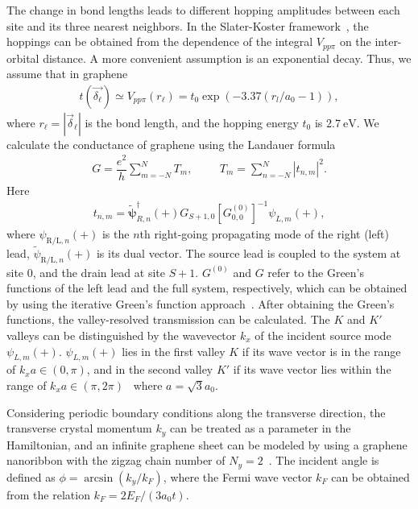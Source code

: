 \documentclass[reprint,amsmath,amssymb,aps,superscriptaddress]{revtex4-2}
\begin{document}
The change in bond lengths leads to different hopping amplitudes between each site and its three nearest neighbors.
In the Slater-Koster framework~\cite{Slater1954}, the hoppings can be obtained from the dependence of the integral $V_{pp\pi}$ on the inter-orbital distance. A more convenient assumption is an exponential decay. Thus, we assume that in graphene~\cite{Pereira2009}
\begin{eqnarray}
	t(\vec{\delta_{\ell}})\simeq V_{pp\pi}(r_{\ell})=t_0\exp(-3.37(r_l/a_0-1)),
\end{eqnarray}
where $r_{\ell}=|\vec{\delta}_{\ell}|$  is the bond length, and the hopping energy $t_0$ is $2.7\ \mathrm{eV}$.
We calculate the conductance of graphene using the Landauer formula~\cite{Ando1991,LiYuan2019}
\begin{eqnarray}
	G=\dfrac{e^2}{h}\sum_{m=-N}^NT_m, \hspace{1cm} T_m=\sum_{n=-N}^N|t_{n,m}|^2.
\end{eqnarray}
Here
\begin{eqnarray}
	t_{n,m}=\tilde{\mathbf{\psi}}^\dag_{R,n}(+)G_{S+1,0}[G_{0,0}^{(0)}]^{-1}\psi_{L,m}(+),
\end{eqnarray}
where $\psi_{\mathrm{R}/\mathrm{L},n}(+)$ is the $n$th right-going propagating mode of the right (left) lead, $\tilde{\psi}_{\mathrm{R}/\mathrm{L},n}(+)$ is its dual vector. The source lead is coupled to the system at site 0, and the drain lead at site $S+1$. $G^{(0)}$ and $G$
refer to the Green's functions of the left lead and the full system, respectively, which can be
obtained by using the iterative Green's function approach~\cite{1996Datta,Khomyakov}.
After obtaining the Green's functions, the valley-resolved transmission can be calculated. The $K$ and $K'$ valleys can be distinguished by the  wavevector $k_x$ of the incident source mode $\psi_{L, m}(+)$.   $\psi_{L,m}(+)$ lies in the first valley $K$ if its wave vector is in the range of $k_xa\in (0, \pi)$, and in the second valley $K'$ if its wave vector lies within the range of $k_xa\in (\pi, 2\pi)$~\cite{Cheng2018,Rycerz} where $a=\sqrt{3}a_0$.

Considering periodic boundary conditions along the transverse direction, the transverse crystal momentum $k_y$ can be treated as a parameter in the Hamiltonian, and an infinite graphene sheet can be modeled by using a graphene nanoribbon with the zigzag chain number of $N_y=2$~\cite{liyuan2018,Li2}.
The incident angle is defined as
$\phi=\arcsin(k_y/k_F)$, where the Fermi wave vector $k_F$ can be obtained from the relation $k_F=2E_F/(3a_0t)$.
\end{document}
